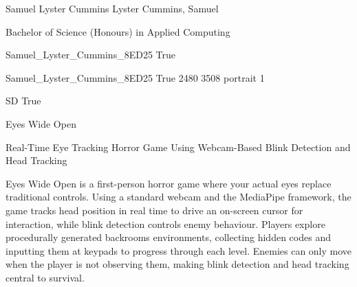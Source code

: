 
\begingroup{}\relax



\def\Key{Samuel_Lyster_Cummins_8ED25}

{Samuel Lyster Cummins}
{Lyster Cummins, Samuel}

{Bachelor of Science (Honours) in Applied Computing}

{Samuel_Lyster_Cummins_8ED25}
{True}

{Samuel_Lyster_Cummins_8ED25}
{True}
{2480}
{3508}
{portrait}
{1}

{SD}
{True}

{Eyes Wide Open}

{Real-Time Eye Tracking Horror Game Using Webcam-Based Blink Detection and Head Tracking}

{Eyes Wide Open is a first-person horror game where your actual eyes replace traditional controls. Using a standard webcam and the MediaPipe framework, the game tracks head position in real time to drive an on-screen cursor for interaction, while blink detection controls enemy behaviour. Players explore procedurally generated backrooms environments, collecting hidden codes and inputting them at keypads to progress through each level. Enemies can only move when the player is not observing them, making blink detection and head tracking central to survival.}

